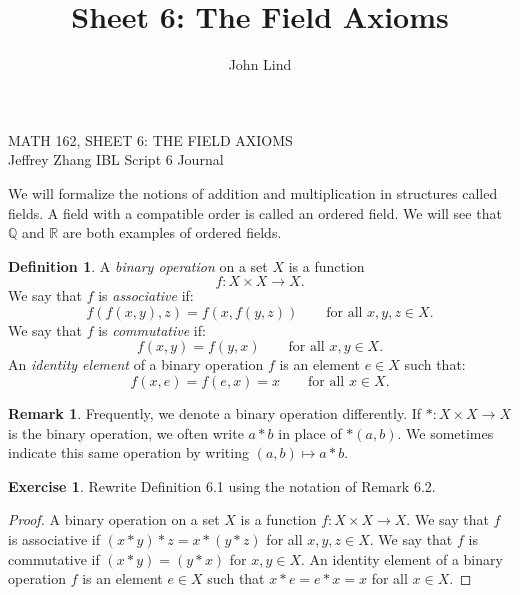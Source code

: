 \documentclass[12pt]{article}
\title{Sheet 6: The Field Axioms}
\author{John Lind}
\newcommand{\bbQ}{\mathbb{Q}}
\newcommand{\bbR}{\mathbb{R}}
\providecommand{\arr}{\longrightarrow}
\renewcommand{\_}[1]{\underline{ #1 }}
\theoremstyle{definition}
\newtheorem{definition}[theorem]{Definition}
\newtheorem{exercise}[theorem]{Exercise}
\newtheorem{remark}[theorem]{Remark}
\numberwithin{equation}{subsection}
\begin{document}
\begin{center}
{\large MATH 162, SHEET 6: THE FIELD AXIOMS} \\ 
{Jeffrey Zhang IBL Script 6 Journal}
\end{center}

\bigskip \bigskip


\setcounter{section}{6}   


We will formalize the notions of addition and multiplication in structures
called fields.  A field with a compatible order is called an ordered field.  
We will see that $\bbQ$ and $\bbR$ are both examples of ordered fields.


\begin{definition}  A \emph{binary operation} on a set $X$ is a function 
\[
f \colon X \times X \arr X.
\]
We say that $f$ is \emph{associative} if:
\[
f(f(x, y), z) = f(x, f(y, z)) \qquad \text{for all $x, y, z \in X$.}
\]
We say that $f$ is \emph{commutative} if:
\[
f(x, y) = f(y, x) \qquad \text{for all $x, y \in X$.}
\]
An \emph{identity element} of a binary operation $f$ is an element $e \in X$ such that:
\[
f(x, e) = f(e, x) = x \qquad \text{for all $x \in X$.}
\]
\end{definition}

\begin{remark}
Frequently, we denote a binary operation differently.  If $*:X\times X\arr X$ is the binary
operation, we often write $a*b$ in place of $*(a,b)$.  We sometimes indicate this same
operation by writing $(a,b)\mapsto a*b$.
\end{remark}

\begin{exercise} Rewrite Definition 6.1 using the notation of Remark 6.2.
\end{exercise}

\begin{proof}
A binary operation on a set $X$ is a function $f : X \times X \to X$. We say that $f$ is associative if $(x * y) * z = x * (y * z)$ for all $x,y,z \in X$. We say that $f$ is commutative if $(x * y) = (y * x)$ for $x,y \in X$. An identity element of a binary operation $f$ is an element $e \in X$ such that $x * e = e * x = x$ for all $x \in X$.
\end{proof}
\end{document}
